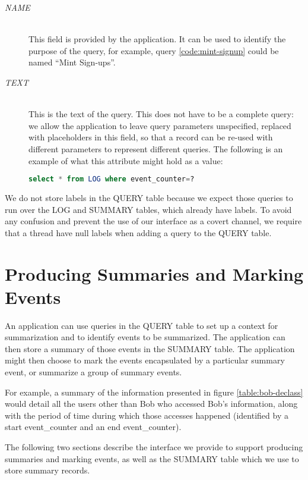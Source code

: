 \begin{description}
  \item[\emph{NAME}] \ \\
    This field is provided by the application. It
    can be used to identify the purpose of the query,
    for example, query \ref{code:mint-signup}
    could be named ``Mint Sign-ups''.
  \item[\emph{TEXT}] \ \\
    This is the text of the query. This does
    not have to be a complete query: we allow the
    application to leave query parameters unspecified,
    replaced with placeholders in this field,
    so that a record can be re-used with different
    parameters to represent different queries.
    The following is an example of what this
    attribute might hold as a value:

\begin{lstlisting}[language=SQL, deletendkeywords={TIMESTAMP}]
select * from LOG where event_counter=?
\end{lstlisting}

\end{description}

\noindent
We do not store labels in the QUERY table because we expect those queries to run over the LOG and SUMMARY tables, which already have labels. To avoid any confusion and prevent the use of our interface as a covert channel, we require that a thread have null labels when adding a query to the QUERY table.

\section{Producing Summaries and Marking Events}
\label{model:summaries}
An application can use queries in the QUERY table to set up a context for summarization and to identify events to be summarized. The application can then store a summary of those events in the SUMMARY table. The application might then choose to mark the events encapsulated by a particular summary event, or summarize a group of summary events.

For example, a summary of the information presented in figure \ref{table:bob-declass} would detail all the users other than Bob who accessed Bob's information, along with the period of time during which those accesses happened (identified by a start event\_counter and an end event\_counter).

The following two sections describe the interface we provide to support producing summaries and marking events, as well as the SUMMARY table which we use to store summary records.

